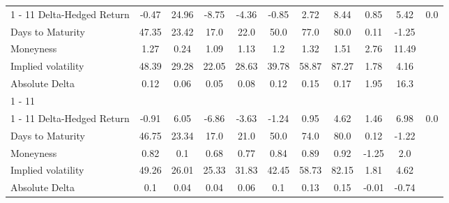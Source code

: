 \begin{longtable}{@{}lcccccccccc@{}}
\cmidrule{1%
-%
11}%
Delta{-}Hedged Return&{-}0.47&24.96&{-}8.75&{-}4.36&{-}0.85&2.72&8.44&0.85&5.42&0.0\\%
Days to Maturity&47.35&23.42&17.0&22.0&50.0&77.0&80.0&0.11&{-}1.25&\\%
Moneyness&1.27&0.24&1.09&1.13&1.2&1.32&1.51&2.76&11.49&\\%
Implied volatility&48.39&29.28&22.05&28.63&39.78&58.87&87.27&1.78&4.16&\\%
Absolute Delta&0.12&0.06&0.05&0.08&0.12&0.15&0.17&1.95&16.3&\\%
\cmidrule{1%
-%
11}%
\multicolumn{11}{l}{Panel L: Short Term Otm Put (N=425,807)}\\%
\cmidrule{1%
-%
11}%
Delta{-}Hedged Return&{-}0.91&6.05&{-}6.86&{-}3.63&{-}1.24&0.95&4.62&1.46&6.98&0.0\\%
Days to Maturity&46.75&23.34&17.0&21.0&50.0&74.0&80.0&0.12&{-}1.22&\\%
Moneyness&0.82&0.1&0.68&0.77&0.84&0.89&0.92&{-}1.25&2.0&\\%
Implied volatility&49.26&26.01&25.33&31.83&42.45&58.73&82.15&1.81&4.62&\\%
Absolute Delta&0.1&0.04&0.04&0.06&0.1&0.13&0.15&{-}0.01&{-}0.74&\\\bottomrule%
%
\end{longtable}